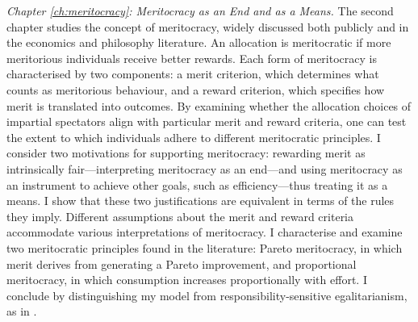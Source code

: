 \emph{Chapter \ref{ch:meritocracy}: Meritocracy as an End and as a Means.} The second chapter studies the concept of meritocracy, widely discussed both publicly and in the economics and philosophy literature. An allocation is meritocratic if more meritorious individuals receive better rewards. Each form of meritocracy is characterised by two components: a merit criterion, which determines what counts as meritorious behaviour, and a reward criterion, which specifies how merit is translated into outcomes. By examining whether the allocation choices of impartial spectators align with particular merit and reward criteria, one can test the extent to which individuals adhere to different meritocratic principles. I consider two motivations for supporting meritocracy: rewarding merit as intrinsically fair—interpreting meritocracy as an end—and using meritocracy as an instrument to achieve other goals, such as efficiency—thus treating it as a means. I show that these two justifications are equivalent in terms of the rules they imply. Different assumptions about the merit and reward criteria accommodate various interpretations of meritocracy. I characterise and examine two meritocratic principles found in the literature: Pareto meritocracy, in which merit derives from generating a Pareto improvement, and proportional meritocracy, in which consumption increases proportionally with effort. I conclude by distinguishing my model from responsibility-sensitive egalitarianism, as in \citep{fleurbaeyFairnessResponsibilityWelfare2008}.

